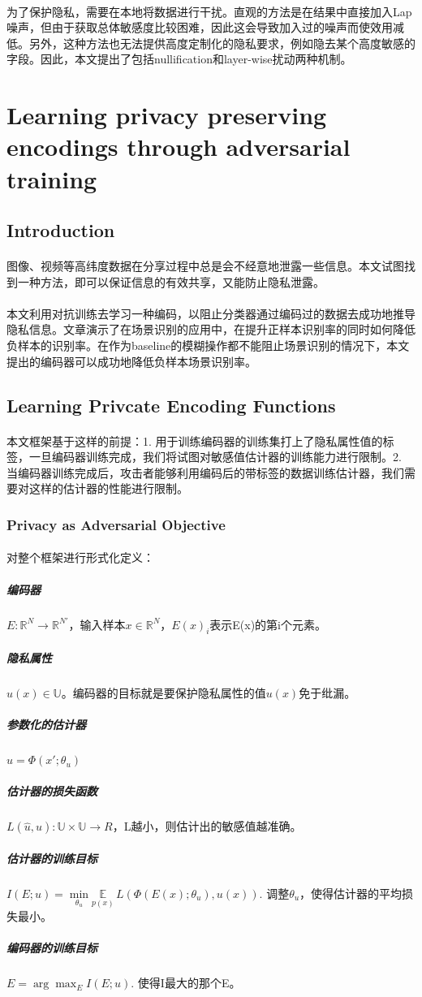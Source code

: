\documentclass[12pt,a4paper]{article}
\begin{document}
\paragraph{} 为了保护隐私，需要在本地将数据进行干扰。直观的方法是在结果中直接加入Lap噪声，但由于获取总体敏感度比较困难，因此这会导致加入过的噪声而使效用减低。另外，这种方法也无法提供高度定制化的隐私要求，例如隐去某个高度敏感的字段。因此，本文提出了包括nullification和layer-wise扰动两种机制。

\newpage
\section{Learning privacy preserving encodings through adversarial training\cite{pittaluga2019learning}}
\subsection{Introduction}
\paragraph{} 图像、视频等高纬度数据在分享过程中总是会不经意地泄露一些信息。本文试图找到一种方法，即可以保证信息的有效共享，又能防止隐私泄露。
\paragraph{} 本文利用对抗训练去学习一种编码，以阻止分类器通过编码过的数据去成功地推导隐私信息。文章演示了在场景识别的应用中，在提升正样本识别率的同时如何降低负样本的识别率。在作为baseline的模糊操作都不能阻止场景识别的情况下，本文提出的编码器可以成功地降低负样本场景识别率。
\subsection{Learning Privcate Encoding Functions}
\paragraph{} 本文框架基于这样的前提：1. 用于训练编码器的训练集打上了隐私属性值的标签，一旦编码器训练完成，我们将试图对敏感值估计器的训练能力进行限制。2. 当编码器训练完成后，攻击者能够利用编码后的带标签的数据训练估计器，我们需要对这样的估计器的性能进行限制。
\subsubsection{Privacy as Adversarial Objective}
\paragraph{}对整个框架进行形式化定义：
	\subparagraph{编码器} $E: \mathbb{R}^N \rightarrow \mathbb{R}^{N'}$，输入样本$x \in \mathbb{R}^N$，$E(x)_i$表示E(x)的第i个元素。
	\subparagraph{隐私属性} $u(x) \in \mathbb{U}$。编码器的目标就是要保护隐私属性的值$u(x)$免于纰漏。
	\subparagraph{参数化的估计器} $\hat u = \Phi(x';\theta_u)$
	\subparagraph{估计器的损失函数} $L(\hat u, u): \mathbb{U} \times \mathbb{U} \rightarrow R$，L越小，则估计出的敏感值越准确。
	\subparagraph{估计器的训练目标} $I(E;u) = \underset{\theta_u}{\min}\underset{p(x)}{\mathbb{E}}\,L(\Phi(E(x);\theta_u),u(x))$. 调整$\theta_u$，使得估计器的平均损失最小。  
	\subparagraph{编码器的训练目标} $E = \arg\max_E I(E;u)$. 使得I最大的那个E。
\end{document}
